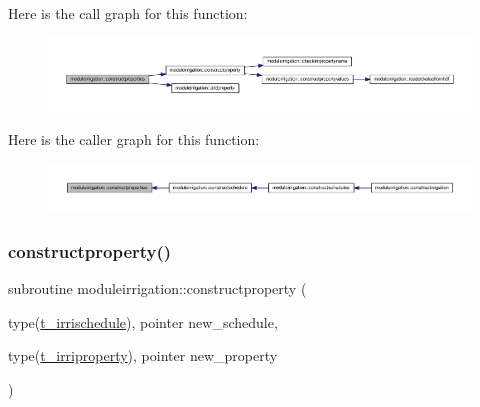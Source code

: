 Here is the call graph for this function\+:\nopagebreak
\begin{figure}[H]
\begin{center}
\leavevmode
\includegraphics[width=350pt]{namespacemoduleirrigation_a3c38f9eb6c59407d288913caba5f6569_cgraph}
\end{center}
\end{figure}
Here is the caller graph for this function\+:\nopagebreak
\begin{figure}[H]
\begin{center}
\leavevmode
\includegraphics[width=350pt]{namespacemoduleirrigation_a3c38f9eb6c59407d288913caba5f6569_icgraph}
\end{center}
\end{figure}
\mbox{\label{namespacemoduleirrigation_a777c0e9f94d23db57aa011c352cc06d9}} 
\subsubsection{\texorpdfstring{constructproperty()}{constructproperty()}}
{\footnotesize\ttfamily subroutine moduleirrigation\+::constructproperty (\begin{DoxyParamCaption}\item[{type(\mbox{\hyperlink{structmoduleirrigation_1_1t__irrischedule}{t\+\_\+irrischedule}}), pointer}]{new\+\_\+schedule,  }\item[{type(\mbox{\hyperlink{structmoduleirrigation_1_1t__irriproperty}{t\+\_\+irriproperty}}), pointer}]{new\+\_\+property }\end{DoxyParamCaption})\hspace{0.3cm}{\ttfamily [private]}}


